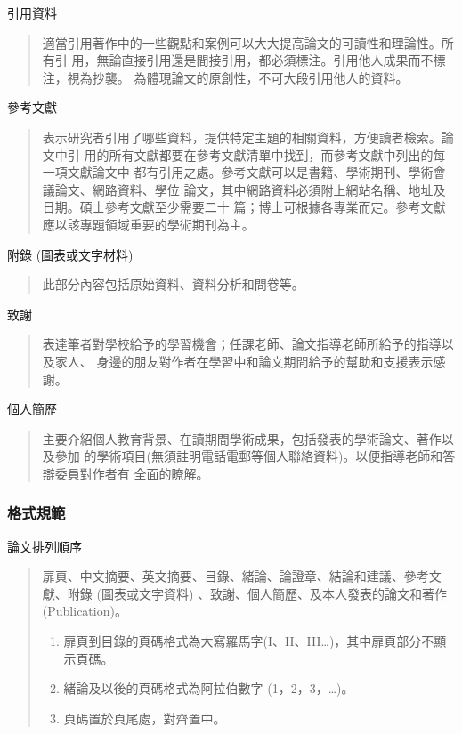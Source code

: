 \documentclass[
    writingLanguage=chinese, %
    addPageTitle=on,  %
    addDeclaration=on, %
    addMUSTlogo=on, %
    addFigTOC=on, %
    addTabTOC=on, %
    refIndent=off, %
    printMod=off, %
]{.def/must}
\begin{document}
\noindent\faHandORight 引用資料
\begin{quote}
適當引用著作中的一些觀點和案例可以大大提高論文的可讀性和理論性。所有引
用，無論直接引用還是間接引用，都必須標注。引用他人成果而不標注，視為抄襲。
為體現論文的原創性，不可大段引用他人的資料。

\end{quote}

\noindent\faHandORight 參考文獻
\begin{quote}
表示研究者引用了哪些資料，提供特定主題的相關資料，方便讀者檢索。論文中引
用的所有文獻都要在參考文獻清單中找到，而參考文獻中列出的每一項文獻論文中
都有引用之處。參考文獻可以是書籍、學術期刊、學術會議論文、網路資料、學位
論文，其中網路資料必須附上網站名稱、地址及日期。碩士參考文獻至少需要二十
篇；博士可根據各專業而定。參考文獻應以該專題領域重要的學術期刊為主。

\end{quote}



\noindent\faHandORight 附錄 (圖表或文字材料)
\begin{quote}
此部分內容包括原始資料、資料分析和問卷等。

\end{quote}



\noindent\faHandORight 致謝
\begin{quote}
表達筆者對學校給予的學習機會；任課老師、論文指導老師所給予的指導以及家人、
身邊的朋友對作者在學習中和論文期間給予的幫助和支援表示感謝。
\end{quote}



\noindent\faHandORight 個人簡歷
\begin{quote}
主要介紹個人教育背景、在讀期間學術成果，包括發表的學術論文、著作以及參加
的學術項目(無須註明電話電郵等個人聯絡資料)。以便指導老師和答辯委員對作者有
全面的瞭解。
\end{quote}



\subsubsection{格式規範}

\noindent\faHandORight 論文排列順序
\begin{quote}
扉頁、中文摘要、英文摘要、目錄、緒論、論證章、結論和建議、參考文獻、附錄
(圖表或文字資料) 、致謝、個人簡歷、及本人發表的論文和著作 (Publication)。

\begin{enumerate}
    \item 扉頁到目錄的頁碼格式為大寫羅馬字(I、II、III…)，其中扉頁部分不顯示頁碼。
    \item 緒論及以後的頁碼格式為阿拉伯數字 (1，2，3，…)。
    \item 頁碼置於頁尾處，對齊置中。
\end{enumerate}

\end{quote}
\end{document}
